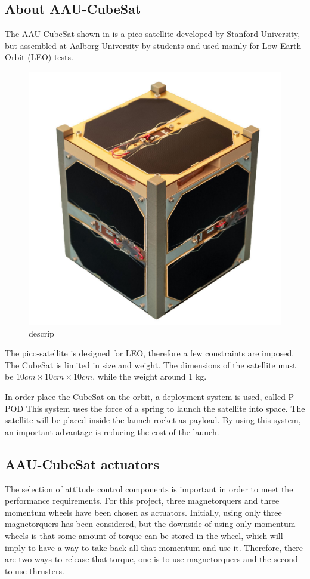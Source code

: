\subsection{About AAU-CubeSat}
The AAU-CubeSat shown in  is a pico-satellite developed by Stanford University, but assembled at Aalborg University by students and used mainly for Low Earth Orbit (LEO)  tests.
\begin{figure}[H]
	\centering
	\includegraphics[width=0.3\linewidth]{figures/aau_cubsat}
	\caption{descrip}
	\label{fig:pico}
\end{figure}
The pico-satellite is designed for LEO, therefore a few constraints are imposed. The CubeSat is limited in size and weight. The dimensions of the satellite must be $10cm\times10cm\times10cm$, while the weight around 1 kg. 

In order place the CubeSat on the orbit, a deployment system is used, called P-POD  This system uses the force of a spring to launch the satellite into space. The satellite will be placed inside the launch rocket as payload. By using this system, an important advantage is reducing the cost of the launch.
%
\subsection{AAU-CubeSat actuators}
The selection of attitude control components is important in order to meet the performance requirements. For this project, three magnetorquers and three momentum wheels have been chosen as actuators. Initially, using only three magnetorquers has been considered, but the downside of using only momentum wheels is that some amount of torque can be stored in the wheel, which will imply to have a way to take back all that momentum and use it. Therefore, there are two ways to release that torque, one is to use magnetorquers and the second to use thrusters. 

